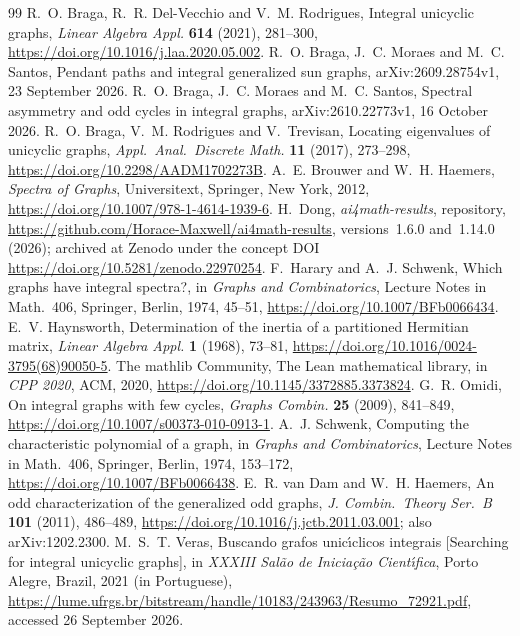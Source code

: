 \documentclass[11pt]{article}
\theoremstyle{definition}
\theoremstyle{remark}
\newcommand{\repoversion}{1.14.0}
\begin{document}
{\footnotesize
\begin{thebibliography}{99}\setlength{\itemsep}{1pt}
R.~O. Braga, R.~R. Del-Vecchio and V.~M. Rodrigues, Integral unicyclic graphs,
\emph{Linear Algebra Appl.} \textbf{614} (2021), 281--300,
\url{https://doi.org/10.1016/j.laa.2020.05.002}.
R.~O. Braga, J.~C. Moraes and M.~C. Santos, Pendant paths and integral
generalized sun graphs, arXiv:2609.28754v1, 23 September 2026.
R.~O. Braga, J.~C. Moraes and M.~C. Santos, Spectral asymmetry and odd cycles
in integral graphs, arXiv:2610.22773v1, 16 October 2026.
R.~O. Braga, V.~M. Rodrigues and V.~Trevisan, Locating eigenvalues of
unicyclic graphs, \emph{Appl.\ Anal.\ Discrete Math.} \textbf{11} (2017),
273--298, \url{https://doi.org/10.2298/AADM1702273B}.
A.~E. Brouwer and W.~H. Haemers, \emph{Spectra of Graphs}, Universitext,
Springer, New York, 2012, \url{https://doi.org/10.1007/978-1-4614-1939-6}.
H.~Dong, \emph{ai4math-results}, repository,
\url{https://github.com/Horace-Maxwell/ai4math-results}, versions~1.6.0
and~\repoversion{} (2026); archived at Zenodo under the concept DOI
\url{https://doi.org/10.5281/zenodo.22970254}.
F.~Harary and A.~J. Schwenk, Which graphs have integral spectra?, in
\emph{Graphs and Combinatorics}, Lecture Notes in Math.~406, Springer, Berlin,
1974, 45--51, \url{https://doi.org/10.1007/BFb0066434}.
E.~V. Haynsworth, Determination of the inertia of a partitioned Hermitian
matrix, \emph{Linear Algebra Appl.} \textbf{1} (1968), 73--81,
\url{https://doi.org/10.1016/0024-3795(68)90050-5}.
The mathlib Community, The Lean mathematical library, in \emph{CPP 2020},
ACM, 2020, \url{https://doi.org/10.1145/3372885.3373824}.
G.~R. Omidi, On integral graphs with few cycles, \emph{Graphs Combin.}
\textbf{25} (2009), 841--849,
\url{https://doi.org/10.1007/s00373-010-0913-1}.
A.~J. Schwenk, Computing the characteristic polynomial of a graph, in
\emph{Graphs and Combinatorics}, Lecture Notes in Math.~406, Springer, Berlin,
1974, 153--172, \url{https://doi.org/10.1007/BFb0066438}.
E.~R. van Dam and W.~H. Haemers, An odd characterization of the generalized
odd graphs, \emph{J. Combin.\ Theory Ser.~B} \textbf{101} (2011), 486--489,
\url{https://doi.org/10.1016/j.jctb.2011.03.001}; also arXiv:1202.2300.
M.~S.~T. Veras, Buscando grafos unic\'{\i}clicos integrais [Searching for
integral unicyclic graphs], in \emph{XXXIII Sal\~ao de Inicia\c{c}\~ao
Cient\'{\i}fica}, Porto Alegre, Brazil, 2021 (in Portuguese),
\url{https://lume.ufrgs.br/bitstream/handle/10183/243963/Resumo_72921.pdf},
accessed 26 September 2026.
\end{thebibliography}}
\end{document}
